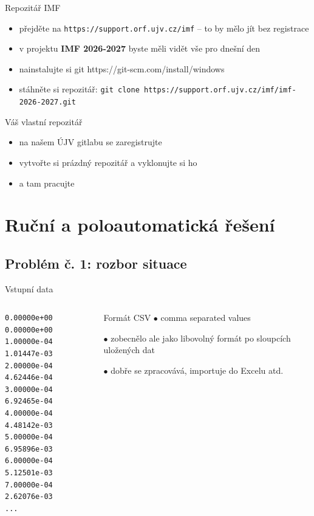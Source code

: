 \documentclass{beamer}
\begin{document}
\begin{frame}{Repozitář IMF}
  \begin{itemize}
    \item přejděte na \texttt{https://support.orf.ujv.cz/imf} -- to by mělo jít bez registrace
    \item v projektu \textbf{IMF 2026-2027} byste měli vidět vše pro dnešní den 
    \item nainstalujte si git https://git-scm.com/install/windows
    \item stáhněte si repozitář: \texttt{git clone https://support.orf.ujv.cz/imf/imf-2026-2027.git}
  \end{itemize}
\end{frame}

\begin{frame}{Váš vlastní repozitář}
  \begin{itemize}
    \item na našem ÚJV gitlabu se zaregistrujte
    \item vytvořte si prázdný repozitář a vyklonujte si ho
    \item a tam pracujte
  \end{itemize}
\end{frame}

\section{Ruční a poloautomatická řešení}

\subsection{Problém č. 1: rozbor situace}

\begin{frame}[fragile]{Vstupní data}
  \begin{columns}
      {\scriptsize
      \begin{verbatim}
0.00000e+00 0.00000e+00
1.00000e-04 1.01447e-03
2.00000e-04 4.62446e-04
3.00000e-04 6.92465e-04
4.00000e-04 4.48142e-03
5.00000e-04 6.95896e-03
6.00000e-04 5.12501e-03
7.00000e-04 2.62076e-03
...
      \end{verbatim}
      }
      \begin{block}{Formát CSV}
        $\bullet$ comma separated values

        $\bullet$ zobecnělo ale jako libovolný formát po sloupcích uložených dat

        $\bullet$ dobře se zpracovává, importuje do Excelu atd.
      \end{block}
  \end{columns}
\end{frame}
\end{document}
